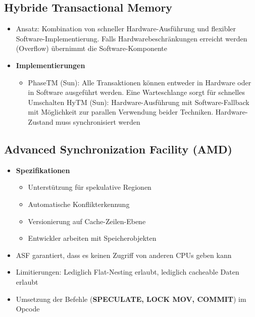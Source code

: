 \subsection{Hybride Transactional Memory}
\begin{itemize}
	\item Ansatz: Kombination von schneller Hardware-Ausführung und flexibler Software-Implementierung. Falls Hardwarebeschränkungen erreicht werden (Overflow) übernimmt die Software-Komponente
	\item \textbf{Implementierungen}
	\begin{itemize}
		\item PhaseTM (Sun): Alle Transaktionen können entweder in Hardware oder in Software ausgeführt werden. Eine Warteschlange sorgt für schnelles Umschalten
		\itee HyTM (Sun): Hardware-Ausführung mit Software-Fallback mit Möglichkeit zur parallen Verwendung beider Techniken. Hardware-Zustand muss synchronisiert werden
	\end{itemize}
\end{itemize}


\subsection{Advanced Synchronization Facility (AMD)}
\begin{itemize}
	\item \textbf{Spezifikationen}
	\begin{itemize}
		\item Unterstützung für spekulative Regionen
		\item Automatische Konflikterkennung
		\item Versionierung auf Cache-Zeilen-Ebene
		\item Entwickler arbeiten mit Speicherobjekten
	\end{itemize}
	\item ASF garantiert, dass es keinen Zugriff von anderen CPUs geben kann
	\item Limitierungen: Lediglich Flat-Nesting erlaubt, lediglich cacheable Daten erlaubt %
	\item Umsetzung der Befehle (\textbf{SPECULATE, LOCK MOV, COMMIT}) im Opcode
\end{itemize}


